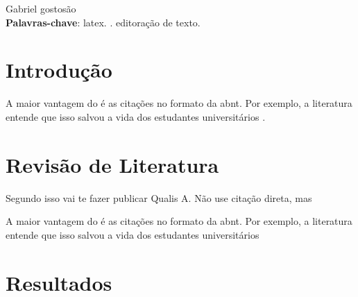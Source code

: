 \documentclass[
	article,
	12pt,
	oneside,
	a4paper,
	english,
	brazil
	]{abntex2}
\begin{document}
\maketitle



\begin{resumoumacoluna}
 Gabriel gostosão\\
 
 \textbf{Palavras-chave}: latex. \abnTeX. editoração de texto.
\end{resumoumacoluna}

\textual
\section{Introdução}

A maior vantagem do \abnTeX é as citações no formato da abnt. Por exemplo, a literatura entende que isso salvou a vida dos estudantes universitários \cite{Abreu1999}. 

\section{Revisão de Literatura}
Segundo  isso vai te fazer publicar Qualis A. Não use citação direta, mas

\begin{citacao}
A maior vantagem do \abnTeX é as citações no formato da abnt. Por exemplo, a literatura entende que isso salvou a vida dos estudantes universitários \cite{Abreu1999}
\end{citacao}


\section{Resultados}



\end{document}
